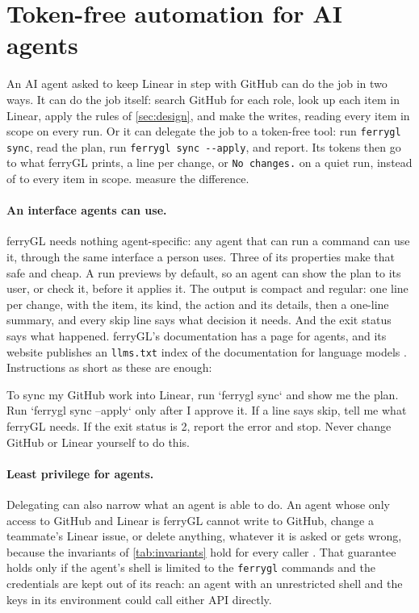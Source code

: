 \documentclass[11pt,a4paper]{article}
\newcommand{\ferry}{ferryGL}
\newcommand{\code}[1]{\texttt{#1}}
\newcommand{\opt}[1]{\texttt{-{}-#1}}
\newcommand{\action}[1]{\textsf{#1}}
\begin{document}
\section{Token-free automation for AI agents}
\label{sec:agents}

An AI agent asked to keep Linear in step with GitHub can do the job in two ways. It can do the job itself: search GitHub for
each role, look up each item in Linear, apply the rules of \cref{sec:design}, and make the
writes, reading every item in scope on every run. Or it can delegate the job to a token-free
tool: run \code{ferrygl sync}, read the plan, run \code{ferrygl sync \opt{apply}}, and report.
Its tokens then go to what \ferry{} prints, a line per change, or \code{No changes.} on a quiet
run, instead of to every item in scope.  measure the
difference.

\paragraph{An interface agents can use.} \ferry{} needs nothing agent-specific: any agent that
can run a command can use it, through the same interface a person uses. Three of its properties
make that safe and cheap. A run previews by default, so an agent can show the plan to its user,
or check it, before it applies it. The output is compact and regular: one line per change, with
the item, its kind, the action and its details, then a one-line summary, and every
\action{skip} line says what decision it needs. And the exit status says what happened.
\ferry's documentation has a page for agents, and its website publishes an \code{llms.txt}
index of the documentation for language models \cite{howard2024llmstxt}. Instructions as short
as these are enough:
\begin{snippet}
To sync my GitHub work into Linear, run `ferrygl sync` and show me the plan.
Run `ferrygl sync --apply` only after I approve it. If a line says skip,
tell me what ferryGL needs. If the exit status is 2, report the error and stop.
Never change GitHub or Linear yourself to do this.
\end{snippet}

\paragraph{Least privilege for agents.} Delegating can also narrow what an agent is able to do.
An agent whose only access to GitHub and Linear is \ferry{} cannot write to GitHub, change a
teammate's Linear issue, or delete anything, whatever it is asked or gets wrong, because the
invariants of \cref{tab:invariants} hold for every caller \cite{saltzer1975protection}. That
guarantee holds only if the agent's shell is limited to the \code{ferrygl} commands and the
credentials are kept out of its reach: an agent with an unrestricted shell and the keys in its
environment could call either API directly.
\end{document}
